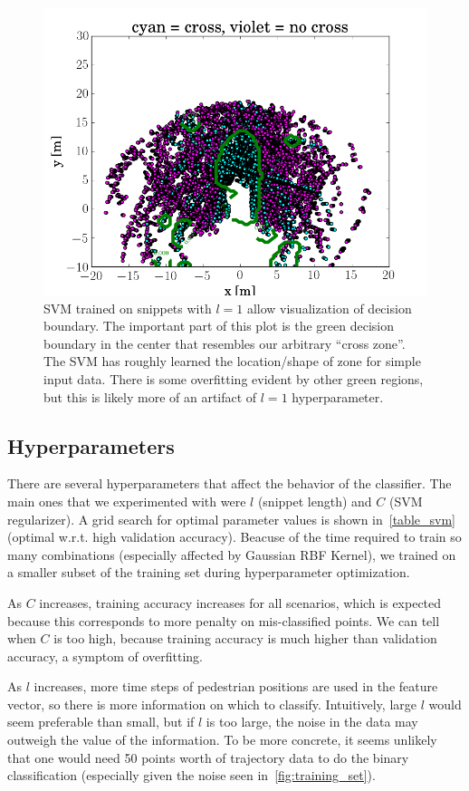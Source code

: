 \begin{figure}
	\centering
	\includegraphics [trim=0 0 0 0, clip, angle=0, width=0.8\columnwidth,
	keepaspectratio]{figures/svm_snippet1}
	\caption{SVM trained on snippets with $l=1$ allow visualization of decision boundary. The important part of this plot is the green decision boundary in the center that resembles our arbitrary ``cross zone''. The SVM has roughly learned the location/shape of zone for simple input data. There is some overfitting evident by other green regions, but this is likely more of an artifact of $l=1$ hyperparameter.} 
	\label{fig:svm_snippet1} 
\end{figure}

\subsection{Hyperparameters}
There are several hyperparameters that affect the behavior of the classifier.
The main ones that we experimented with were $l$ (snippet length) and $C$ (SVM regularizer).
A grid search for optimal parameter values is shown in~\cref{table_svm} (optimal w.r.t. high validation accuracy).
Beacuse of the time required to train so many combinations (especially affected by Gaussian RBF Kernel), we trained on a smaller subset of the training set during hyperparameter optimization.

As $C$ increases, training accuracy increases for all scenarios, which is expected because this corresponds to more penalty on mis-classified points.
We can tell when $C$ is too high, because training accuracy is much higher than validation accuracy, a symptom of overfitting.

As $l$ increases, more time steps of pedestrian positions are used in the feature vector, so there is more information on which to classify.
Intuitively, large $l$ would seem preferable than small, but if $l$ is too large, the noise in the data may outweigh the value of the information.
To be more concrete, it seems unlikely that one would need 50 points worth of trajectory data to do the binary classification (especially given the noise seen in~\cref{fig:training_set}).

